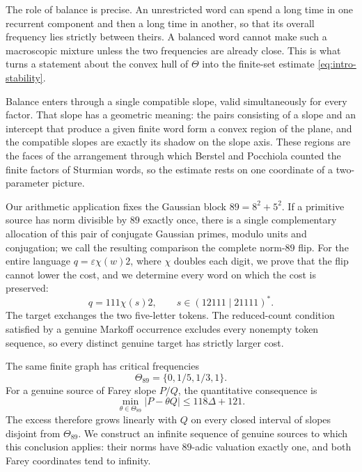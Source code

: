 The role of balance is precise. An unrestricted word can spend a long time
in one recurrent component and then a long time in another, so that its
overall frequency lies strictly between theirs. A balanced word cannot make
such a macroscopic mixture unless the two frequencies are already close.
This is what turns a statement about the convex hull of $\Theta$ into the
finite-set estimate \eqref{eq:intro-stability}.

Balance enters through a single compatible slope, valid simultaneously for
every factor. That slope has a geometric meaning: the pairs consisting of a
slope and an intercept that produce a given finite word form a convex region
of the plane, and the compatible slopes are exactly its shadow on the slope
axis. These regions are the faces of the arrangement through which Berstel
and Pocchiola counted the finite factors of Sturmian words, so the estimate
rests on one coordinate of a two-parameter picture.

Our arithmetic application fixes the Gaussian block $89=8^2+5^2$. If a
primitive source has norm divisible by $89$ exactly once, there is a single
complementary allocation of this pair of conjugate Gaussian primes, modulo
units and conjugation; we call the resulting comparison the complete
norm-$89$ flip. For the entire language $q=\varepsilon\chi(w)2$, where
$\chi$ doubles each digit, we prove that the flip cannot lower the cost,
and we determine every word on which the cost is preserved:
\begin{equation}
 q=111\chi(s)2,\qquad s\in(12111\mid21111)^*.
 \label{eq:intro-equality}
\end{equation}
The target exchanges the two five-letter tokens. The reduced-count
condition satisfied by a genuine Markoff occurrence excludes every nonempty
token sequence, so every distinct genuine target has strictly larger cost.

The same finite graph has critical frequencies
\begin{equation}
 \Theta_{89}=\{0,1/5,1/3,1\}.
 \label{eq:intro-critical}
\end{equation}
For a genuine source of Farey slope $P/Q$, the quantitative consequence is
\begin{equation}
 \min_{\theta\in\Theta_{89}}|P-\theta Q|\leqslant118\Delta+121.
 \label{eq:intro-farey}
\end{equation}
The excess therefore grows linearly with $Q$ on every closed interval of
slopes disjoint from $\Theta_{89}$. We construct an infinite sequence of
genuine sources to which this conclusion applies: their norms have $89$-adic
valuation exactly one, and both Farey coordinates tend to infinity.

